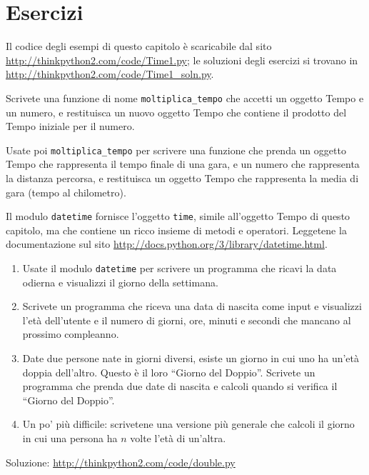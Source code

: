 \documentclass[10pt]{book}
\begin{document}
\section{Esercizi}

Il codice degli esempi di questo capitolo è scaricabile dal sito
\url{http://thinkpython2.com/code/Time1.py}; le soluzioni degli esercizi si trovano in \url{http://thinkpython2.com/code/Time1_soln.py}.

\vspace{0.2in}
\begin{exercise}

Scrivete una funzione di nome \verb"moltiplica_tempo" che accetti un oggetto Tempo e un numero, e restituisca un nuovo oggetto Tempo che contiene il prodotto del Tempo iniziale per il numero.

Usate poi \verb"moltiplica_tempo" per scrivere una funzione che prenda un oggetto Tempo che rappresenta il tempo finale di una gara, e un numero che rappresenta la distanza percorsa, e restituisca un oggetto Tempo che rappresenta la media di gara (tempo al chilometro).

\end{exercise}

\vspace{0.2in}
\begin{exercise}

Il modulo {\tt datetime} fornisce l'oggetto {\tt time}, simile all'oggetto Tempo di questo capitolo, ma che contiene un ricco insieme di metodi e operatori. Leggetene la documentazione sul sito \url{http://docs.python.org/3/library/datetime.html}.

\begin{enumerate}

\item Usate il modulo {\tt datetime} per scrivere un programma che ricavi la data odierna e visualizzi il giorno della settimana.

\item Scrivete un programma che riceva una data di nascita come input e visualizzi l'età dell'utente e il numero di giorni, ore, minuti e secondi che mancano al prossimo compleanno.

\item Date due persone nate in giorni diversi, esiste un giorno in cui uno ha un'età doppia dell'altro. Questo è il loro ``Giorno del Doppio''. Scrivete un programma che prenda due date di nascita e calcoli quando si verifica il ``Giorno del Doppio''.

\item Un po' più difficile: scrivetene una versione più generale che calcoli il giorno in cui una persona ha $n$ volte l'età di un'altra.

\end{enumerate}

Soluzione: \url{http://thinkpython2.com/code/double.py}

\end{exercise}
\end{document}
